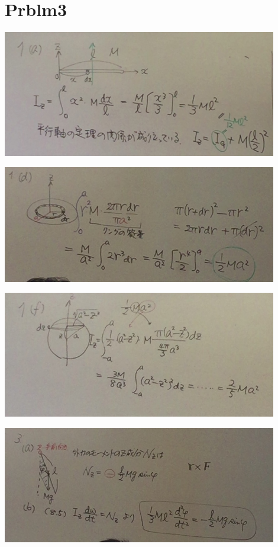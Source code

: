 \documentclass{jsarticle}
\begin{document}
\section{Prblm3}
	\begin{center}
		\includegraphics[width=12cm]{5_20_1.JPG}
	\end{center}
	\begin{center}
		\includegraphics[width=12cm]{5_20_2.JPG}
	\end{center}
	\begin{center}
		\includegraphics[width=12cm]{5_20_3.JPG}
	\end{center}
	\begin{center}
		\includegraphics[width=12cm]{5_20_4.JPG}
	\end{center}
\end{document}
